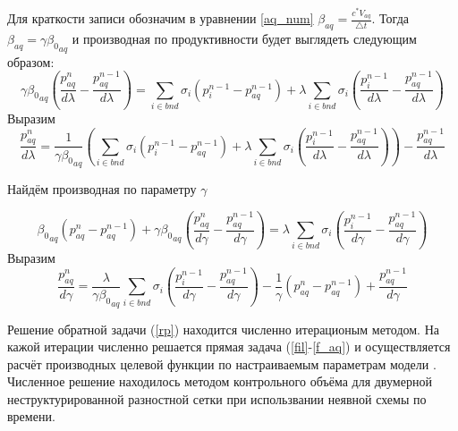 \documentclass[14pt]{article}
\begin{document}
Для краткости записи обозначим в уравнении \ref{aq_num} $ \beta_{aq} = \frac{c^* V_{aq}}{\bigtriangleup t} $. Тогда $ \beta_{aq} = \gamma{\beta_0}_{aq} $ и производная по продуктивности будет выглядеть следующим образом:
\begin{equation} \label{eq_aq_dlambda}
\gamma{\beta_0}_{aq}\left(\frac{p_{aq}^n}{d\lambda}  -\frac{p_{aq}^{n-1}}{d\lambda}\right) =\sum_{i \in bnd}\sigma_i(p^{n-1}_i-p_{aq}^{n-1}) +  \lambda\sum_{i \in bnd}\sigma_i(\frac{p^{n-1}_i}{d\lambda}-\frac{p_{aq}^{n-1}}{d\lambda})
\end{equation}
Выразим
\begin{equation} \label{eq_aq_dlambda}
\frac{p_{aq}^n}{d\lambda} =\frac{1}{\gamma{\beta_0}_{aq}}\left(\sum_{i \in bnd}\sigma_i(p^{n-1}_i-p_{aq}^{n-1}) +  \lambda\sum_{i \in bnd}\sigma_i(\frac{p^{n-1}_i}{d\lambda}-\frac{p_{aq}^{n-1}}{d\lambda})\right) -\frac{p_{aq}^{n-1}}{d\lambda}
\end{equation}

Найдём производная по параметру $ \gamma $ 



\begin{equation} \label{rp}
{\beta_0}_{aq}(p_{aq}^n - p_{aq}^{n-1}) + \gamma{\beta_0}_{aq} \left(\frac{p_{aq}^n}{d\gamma}  -\frac{p_{aq}^{n-1}}{d\gamma}\right) = \lambda\sum_{i \in bnd}\sigma_i(\frac{p^{n-1}_i}{d\gamma}-\frac{p_{aq}^{n-1}}{d\gamma})
\end{equation}
Выразим
\begin{equation} \label{rp}
\frac{p_{aq}^n}{d\gamma}   = \frac{\lambda}{\gamma{\beta_0}_{aq} }\sum_{i \in bnd}\sigma_i(\frac{p^{n-1}_i}{d\gamma}-\frac{p_{aq}^{n-1}}{d\gamma}) - \frac{1}{\gamma}(p_{aq}^n - p_{aq}^{n-1}) + \frac{p_{aq}^{n-1}}{d\gamma}
\end{equation}

Решение обратной задачи (\ref{rp}) находится численно итерационым методом. На кажой итерации численно решается прямая задача (\ref{fil}-\ref{f_aq}) и осуществляется расчёт производных целевой функции по настраиваемым параметрам модели \cite{opt}. Численное решение находилось методом контрольного объёма  для двумерной неструктурированной разностной сетки при использвании неявной схемы по времени.
\end{document}
